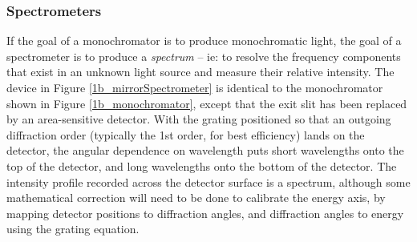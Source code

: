 

\subsubsection{Spectrometers}
If the goal of a monochromator is to produce monochromatic light, the goal of a spectrometer is to produce a \emph{spectrum} -- ie: to resolve the frequency components that exist in an unknown light source and measure their relative intensity.  The device in Figure \ref{1b_mirrorSpectrometer} is identical to the monochromator shown in Figure \ref{1b_monochromator}, except that the exit slit has been replaced by an area-sensitive detector.  With the grating positioned so that an outgoing diffraction order (typically the 1st order, for best efficiency) lands on the detector, the angular dependence on wavelength puts short wavelengths onto the top of the detector, and long wavelengths onto the bottom of the detector.  The intensity profile recorded across the detector surface is a spectrum, although some mathematical correction will need to be done to calibrate the energy axis, by mapping detector positions to diffraction angles, and diffraction angles to energy using the grating equation.


